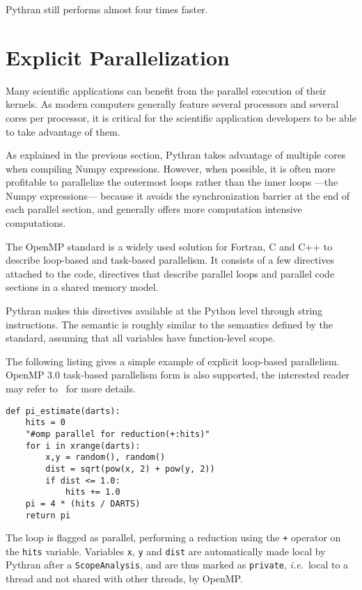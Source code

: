 \documentclass[10pt, onecolumn, preprint]{sigplanconf}
\providecommand{\ie}[1][~]{\textit{i.e.}#1}
\begin{document}
\noindent Pythran still performs almost four times faster.

\section{Explicit Parallelization}
\label{sec:openmp}

Many scientific applications can benefit from the parallel execution of their
kernels. As modern computers generally feature several processors and several
cores per processor, it is critical for the scientific application developers to
be able to take advantage of them.

As explained in the previous section, Pythran takes advantage of multiple cores
when compiling Numpy expressions. However, when possible, it is often more
profitable to parallelize the outermost loops rather than the inner loops
---the Numpy expressions--- because it avoids the synchronization barrier at
the end of each parallel section, and generally offers more computation
intensive computations.

The OpenMP standard\cite{openmp3.1} is a widely used solution for Fortran, C
and C++ to describe loop-based and task-based parallelism. It consists of a few
directives attached to the code, directives that describe parallel loops and parallel code
sections in a shared memory model.

Pythran makes this directives available at the Python level through string
instructions. The semantic is roughly similar to the semantics defined by the
standard, assuming that all variables have function-level scope.

The following listing gives a simple example of explicit loop-based 
parallelism. OpenMP 3.0 task-based parallelism form is also supported, the
interested reader may refer to~\cite{pyhpc2013} for more details.

\begin{lstlisting}
def pi_estimate(darts):
    hits = 0
    "#omp parallel for reduction(+:hits)"
    for i in xrange(darts):
        x,y = random(), random()
        dist = sqrt(pow(x, 2) + pow(y, 2))
        if dist <= 1.0:
            hits += 1.0
    pi = 4 * (hits / DARTS)
    return pi
\end{lstlisting}

The loop is flagged as parallel, performing a reduction using the \texttt{+}
operator on the \texttt{hits} variable. Variables \texttt{x}, \texttt{y} and
\texttt{dist} are automatically made local by Pythran after a
\texttt{ScopeAnalysis}, and are thus marked as \texttt{private}, \ie{local to
a thread and not shared with other threads, by OpenMP}.
\end{document}
